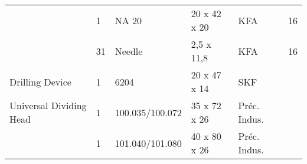 \begin{tabular}{@{}|l|l|l|l|l|l|@{}}
    & 1              & NA 20             & 20 x 42 x 20        & KFA                   & 16                \\
    & 31             & Needle            & 2,5 x 11,8          & KFA                   & 16                \\
    \midrule
    Drilling Device            & 1              & 6204              & 20 x 47 x 14        & SKF                   &                   \\
    \midrule
    Universal Dividing Head    & 1              & 100.035/100.072   & 35 x 72 x 26        & Préc. Indus.          &                   \\
    & 1              & 101.040/101.080   & 40 x 80 x 26        & Préc. Indus.          &                   \\
    \bottomrule
\end{tabular}
